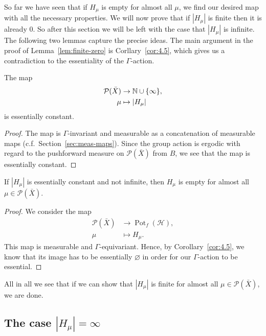 So far we have seen that if \(H_\mu\) is empty for almost all \(\mu\), we find our desired map with all the necessary properties. We will now prove that if \(|H_\mu|\) is finite then it is already 0. So after this section we will be left with the case that \(|H_\mu|\) is infinite. The following two lemmas capture the precise ideas. The main argument in the proof of Lemma~\ref{lem:finite-zero} is Corllary~\ref{cor:4.5}, which gives us a contradiction to the essentiality of the \(\Gamma\)-action.

\begin{lemma}
  \label{lem:h-const}
  The map
  \begin{align*}
    \mathcal{P}(\bar X) &\to \mathbb{N} \cup \{\infty\},\\
    \mu &\mapsto |H_\mu|
  \end{align*}
  is essentially constant.
\end{lemma}

\begin{proof}
  The map is \(\Gamma\)-invariant and measurable as a concatenation of measurable maps (c.f.~Section~\ref{sec:meas-maps}). Since the group action is ergodic with regard to the pushforward measure on \(\mathcal{P}(\bar X)\) from \(B\), we see that the map is essentially constant.
\end{proof}

\begin{lemma}
  \label{lem:finite-zero}
  If \(|H_\mu|\) is essentially constant and not infinite, then \(H_\mu\) is empty for almost all \(\mu \in \mathcal{P}(\bar X)\).
\end{lemma}

\begin{proof}
  We consider the map
  \begin{align*}
    \mathcal{P}(\bar X) & \to \operatorname{Pot}_f(\mathcal{H}),\\
    \mu & \mapsto H_\mu.
  \end{align*}
  This map is measurable and \(\Gamma\)-equivariant. Hence, by Corollary~\ref{cor:4.5}, we know that its image has to be essentially \(\varnothing\) in order for our \(\Gamma\)-action to be essential.
\end{proof}

All in all we see that if we can show that \(|H_\mu|\) is finite for almost all \(\mu \in \mathcal{P}(\bar X)\), we are done. 

\subsection{The case \(|H_\mu| = \infty\)}
\label{sec:N=infty}

